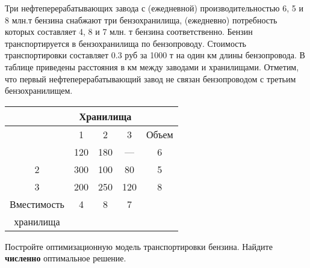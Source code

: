 \begin{exercise}
Три нефтеперерабатывающих завода с (ежедневной) производительностью
6, 5 и 8 млн.т бензина снабжают три бензохранилища, (ежедневно)
потребность которых составляет  4, 8 и 7 млн. т бензина соответственно.
Бензин транспортируется в бензохранилища по бензопроводу. Стоимость
транспортировки составляет 0.3 руб за 1000 т на один км длины бензопровода.
В таблице приведены расстояния в км между заводами и хранилищами.
Отметим, что первый нефтеперерабатывающий завод не связан бензопроводом
с третьим бензохранилищем.
\begin{center}%
	\begin{tabular}{|c|c|c|c|c|} \hline
	& \multicolumn{3}{|c|}{Хранилища} & \\ \hline
 	 & 1 & 2 & 3 & Объем \\ \hline
 	 & 120 & 180 & --- & 6 \\ \hline
	2 & 300 & 100 & 80 & 5 \\ \hline
	3 & 200 & 250 & 120 & 8 \\ \hline
	Вместимость & 4& 8 & 7 & \\ %
	хранилища & & & & \\ \hline
	\end{tabular}
\end{center}
Постройте оптимизационную модель транспортировки бензина.
Найдите \textbf{численно} оптимальное решение.
\end{exercise}